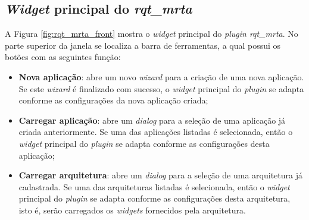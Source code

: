         \subsection{\textit{Widget} principal do \textit{rqt\_mrta}} \label{subsec:rqt_mrta_front}
            A Figura \ref{fig:rqt_mrta_front} mostra o \textit{widget} principal do \textit{plugin rqt\_mrta}. No parte superior da janela se localiza a barra de ferramentas, a qual possui os botões com as seguintes função:
            
            \begin{itemize}
                \item \textbf{Nova aplicação}: abre um novo \textit{wizard} para a criação de uma nova aplicação. Se este \textit{wizard} é finalizado com sucesso, o \textit{widget} principal do \textit{plugin} se adapta conforme as configurações da nova aplicação criada;
                
                \item \textbf{Carregar aplicação}: abre um \textit{dialog} para a seleção de uma aplicação já criada anteriormente. Se uma das aplicações listadas é selecionada, então o \textit{widget} principal do \textit{plugin} se adapta conforme as configurações desta aplicação;
                
                
                
                \item \textbf{Carregar arquitetura}: abre um \textit{dialog} para a seleção de uma arquitetura já cadastrada. Se uma das arquiteturas listadas é selecionada, então o \textit{widget} principal do \textit{plugin} se adapta conforme as configurações desta arquitetura, isto é, serão carregados os \textit{widgets} fornecidos pela arquitetura.
            \end{itemize}
        

